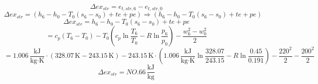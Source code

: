 \[
\Delta ex_{str} = e_{t, str, 6} - e_{t, str, 0}
\]  
\[
\Delta ex_{str} = (h_6 - h_0 - T_0(s_6 - s_0) + te + pe) \Rightarrow (h_6 - h_0 - T_0(s_6 - s_0) + te + pe)
\]  
\[
\Delta ex_{str} = h_6 - h_0 - T_0(s_6 - s_0) + te + pe
\]  
\[
= c_p(T_6 - T_0) - T_0(c_p \ln \frac{T_6}{T_0} - R \ln \frac{p_6}{p_0}) - \frac{w_6^2 - w_0^2}{2}
\]  
\[
= 1.006 \, \frac{\text{kJ}}{\text{kg·K}} \cdot (328.07 \, \text{K} - 243.15 \, \text{K}) - 243.15 \, \text{K} \cdot (1.006 \, \frac{\text{kJ}}{\text{kg·K}} \ln \frac{328.07}{243.15} - R \ln \frac{0.45}{0.191}) - \frac{220^2}{2} - \frac{200^2}{2}
\]  
\[
\Delta ex_{str} = NO.66 \, \frac{\text{kJ}}{\text{kg}}
\]
